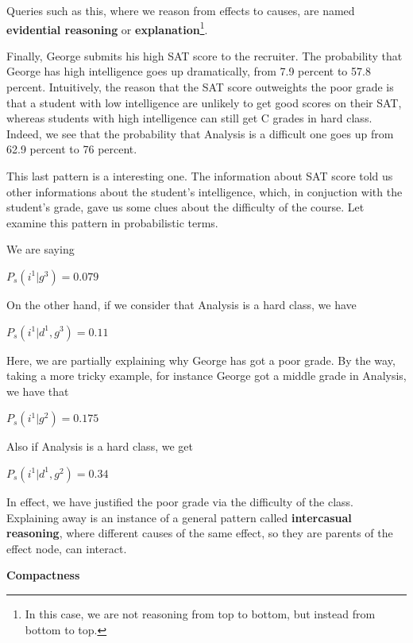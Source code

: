 \begin{example}
    Queries such as this, where we reason from effects to causes, are named \textbf{evidential reasoning} or \textbf{explanation}\footnote{In this case, we are not reasoning from top to bottom, but instead from bottom to top.}. \vspace{3.5pt}

    Finally, George submits his high SAT score to the recruiter. The probability that George has high intelligence goes up dramatically, from 7.9 percent to 57.8 percent. Intuitively, the reason that the SAT score 
    outweights the poor grade is that a student with low intelligence are unlikely to get good scores on their SAT, whereas students with high intelligence can still get C grades in hard class.
    Indeed, we see that the probability that Analysis is a difficult one goes up from 62.9 percent to 76 percent. \vspace{3.5pt} 

    This last pattern is a interesting one. The information about SAT score told us other informations about the student's intelligence, which, in conjuction with the student's grade, gave us some clues about the difficulty of the course. Let examine this pattern in probabilistic terms. \vspace{3.5pt}

    We are saying \vspace{3.5pt}

    $P_s(i^1|g^3) = 0.079$ \vspace{3.5pt}

    On the other hand, if we consider that Analysis is a hard class, we have \vspace{3.5pt}

    $P_s(i^1|d^1, g^3) = 0.11$ \vspace{3.5pt} 

    Here, we are partially explaining why George has got a poor grade. By the way, taking a more tricky example, for instance George got a middle grade in Analysis, we have that \vspace{3.5pt}

    $P_s(i^1|g^2) = 0.175$ \vspace{3.5pt}

    Also if Analysis is a hard class, we get \vspace{3.5pt} 

    $P_s(i^1|d^1, g^2) = 0.34$ \vspace{3.5pt} 

    In effect, we have justified the poor grade via the difficulty of the class. Explaining away is an instance of a general pattern called \textbf{intercasual reasoning},
    where different causes of the same effect, so they are parents of the effect node, can interact.     
\end{example}
\textbf{Compactness} \vspace{3.5pt}

